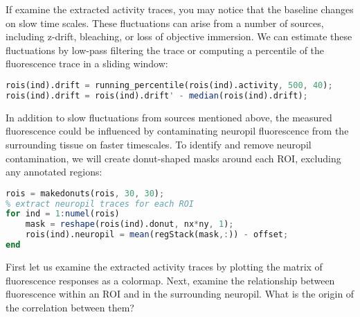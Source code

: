 \documentclass[a4paper]{report}
\newcommand{\nexercise}[0]{\arabic{exercises}\addtocounter{exercises}{1}}
\begin{document}
If examine the extracted activity traces, you may notice that the baseline changes on slow time scales. 
These fluctuations can arise from a number of sources, including z-drift, bleaching, or loss of objective immersion.
We can estimate these fluctuations by low-pass filtering the trace or computing a percentile of the fluorescence trace in a sliding window:  
\begin{lstlisting}[language=Octave]
% estimate 40th percentile in a running window of 500 frames
rois(ind).drift = running_percentile(rois(ind).activity, 500, 40);
rois(ind).drift = rois(ind).drift' - median(rois(ind).drift);
\end{lstlisting}
In addition to slow fluctuations from sources mentioned above, the measured fluorescence could be influenced by contaminating neuropil fluorescence from the surrounding tissue on faster timescales.
To identify and remove neuropil contamination, we will create donut-shaped masks around each ROI, excluding any annotated regions:
\begin{lstlisting}[language=Octave]
% make neuropil masks around each cell excluding other labeled cells
rois = makedonuts(rois, 30, 30);
% extract neuropil traces for each ROI
for ind = 1:numel(rois)
    mask = reshape(rois(ind).donut, nx*ny, 1);
    rois(ind).neuropil = mean(regStack(mask,:)) - offset;
end
\end{lstlisting}
\begin{exercisebox}[frametitle={Exercise \nexercise: Neuropil contamination}]
First let us examine the extracted activity traces by plotting the matrix of fluorescence responses as a colormap.
Next, examine the relationship between fluorescence within an ROI and in the surrounding neuropil. What is the origin of the correlation between them?
\end{exercisebox}
\end{document}
